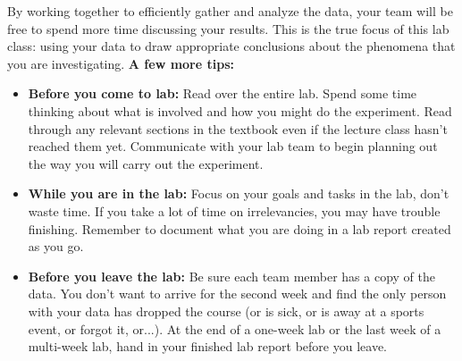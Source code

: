 By working together to efficiently gather and analyze the data, your team will be free to spend more time discussing your results.
This is the true focus of this lab class: using your data to draw appropriate conclusions about the phenomena that you are investigating.
\newline
\textbf{A few more tips:}
\begin{itemize}
\setlength\itemsep{2pt}
\item \textbf{Before you come to lab:} Read over the entire lab.
Spend some time thinking about what is involved and how you might do the experiment. Read through any relevant sections in the textbook even if the lecture class hasn't reached them yet. Communicate with your lab team to begin planning out the way you will carry out the experiment.
\item \textbf{While you are in the lab:} Focus on your goals and tasks in the lab, don't waste time. If you take a lot of time on irrelevancies, you may have trouble finishing. Remember to document what you are doing in a lab report created as you go.
\item \textbf{Before you leave the lab:} Be sure each team member has a copy of the data. You don't want to arrive for the second week and find the only person with your data has dropped the course (or is sick, or is away at a sports event, or forgot it, or...). At the end of a one-week lab or the last week of a multi-week lab, hand in your finished lab report before you leave.
\end{itemize}

